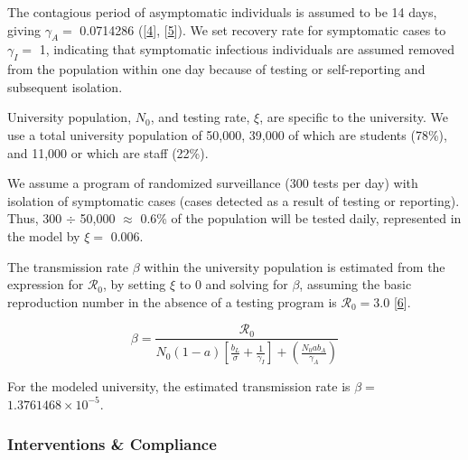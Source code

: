 \documentclass[
]{article}
\begin{document}
The contagious period of asymptomatic individuals is assumed to be 14
days, giving \(\gamma_A=\) 0.0714286
({[}\protect\hyperlink{ref-Long2020-ny}{4}{]},
{[}\protect\hyperlink{ref-Oran2020-aq}{5}{]}). We set recovery rate for
symptomatic cases to \(\gamma_I=\) 1, indicating that symptomatic
infectious individuals are assumed removed from the population within
one day because of testing or self-reporting and subsequent isolation.

University population, \(N_0\), and testing rate, \(\xi\), are specific
to the university. We use a total university population of 50,000,
39,000 of which are students (78\%), and 11,000 or which are staff
(22\%).

We assume a program of randomized surveillance (300 tests per day) with
isolation of symptomatic cases (cases detected as a result of testing or
reporting). Thus, 300 \(\div\) 50,000 \(\approx\) 0.6\% of the
population will be tested daily, represented in the model by \(\xi=\)
0.006.

The transmission rate \(\beta\) within the university population is
estimated from the expression for \(\mathcal{R}_{0}\), by setting
\(\xi\) to 0 and solving for \(\beta\), assuming the basic reproduction
number in the absence of a testing program is \(\mathcal{R}_{0}= 3.0\)
{[}\protect\hyperlink{ref-Park2020-vl}{6}{]}.

\[
\beta= \frac{\mathcal{R}_{0}}{N_{0}\left(1-a\right)\left[\frac{b_{L}}{\sigma}+\frac{1}{\gamma_{I}}\right]+\left(\frac{N_{0}ab_{A}}{\gamma_{A}}\right)}
\]

For the modeled university, the estimated transmission rate is
\(\beta =\) \ensuremath{1.3761468\times 10^{-5}}.

\hypertarget{interventions-compliance}{%
\subsubsection{Interventions \&
Compliance}\label{interventions-compliance}}
\end{document}
